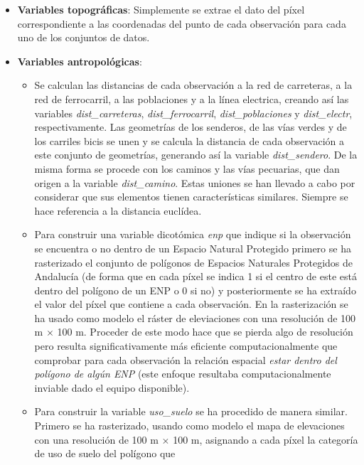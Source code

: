 \documentclass[12pt,a4paper,]{book}
\numberwithin{dummy}{section}
\theoremstyle{ocrenumbox}
\theoremstyle{blacknumex}
\theoremstyle{blacknumbox}
\theoremstyle{ocrenum}
\theoremstyle{ocrenum}
\begin{document}
\begin{itemize}
\item
  \textbf{Variables topográficas}: Simplemente se extrae el dato del
  píxel correspondiente a las coordenadas del punto de cada observación
  para cada uno de los conjuntos de datos.
\item
  \textbf{Variables antropológicas}:

  \begin{itemize}
  \item
    Se calculan las distancias de cada observación a la red de
    carreteras, a la red de ferrocarril, a las poblaciones y a la línea
    electrica, creando así las variables \emph{dist\_carreteras},
    \emph{dist\_ferrocarril}, \emph{dist\_poblaciones} y
    \emph{dist\_electr}, respectivamente. Las geometrías de los
    senderos, de las vías verdes y de los carriles bicis se unen y se
    calcula la distancia de cada observación a este conjunto de
    geometrías, generando así la variable \emph{dist\_sendero}. De la
    misma forma se procede con los caminos y las vías pecuarias, que dan
    origen a la variable \emph{dist\_camino}. Estas uniones se han
    llevado a cabo por considerar que sus elementos tienen
    características similares. Siempre se hace referencia a la distancia
    euclídea.
  \item
    Para construir una variable dicotómica \emph{enp} que indique si la
    observación se encuentra o no dentro de un Espacio Natural Protegido
    primero se ha rasterizado el conjunto de polígonos de Espacios
    Naturales Protegidos de Andalucía (de forma que en cada píxel se
    indica 1 si el centro de este está dentro del polígono de un ENP o 0
    si no) y posteriormente se ha extraído el valor del píxel que
    contiene a cada observación. En la rasterización se ha usado como
    modelo el ráster de eleviaciones con una resolución de 100 m
    \(\times\) 100 m. Proceder de este modo hace que se pierda algo de
    resolución pero resulta significativamente más eficiente
    computacionalmente que comprobar para cada observación la relación
    espacial \emph{estar dentro del polígono de algún ENP} (este enfoque
    resultaba computacionalmente inviable dado el equipo disponible).
  \item
    Para construir la variable \emph{uso\_suelo} se ha procedido de
    manera similar. Primero se ha rasterizado, usando como modelo el
    mapa de elevaciones con una resolución de 100 m \(\times\) 100 m,
    asignando a cada píxel la categoría de uso de suelo del polígono que

\end{itemize}
\end{itemize}
\end{document}
